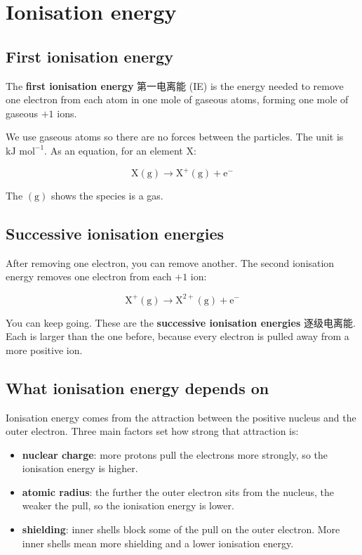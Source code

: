 \documentclass[11pt]{article}
\begin{document}
\section*{Ionisation energy}

\subsection*{First ionisation energy}

The \textbf{first ionisation energy} 第一电离能 (IE) is the energy needed to remove one electron from each atom in one mole of gaseous atoms, forming one mole of gaseous $+1$ ions.

We use gaseous atoms so there are no forces between the particles. The unit is $\text{kJ mol}^{-1}$. As an equation, for an element X:

\[
\text{X}(\text{g}) \rightarrow \text{X}^{+}(\text{g}) + \text{e}^{-}
\]

The $(\text{g})$ shows the species is a gas.

\subsection*{Successive ionisation energies}

After removing one electron, you can remove another. The second ionisation energy removes one electron from each $+1$ ion:

\[
\text{X}^{+}(\text{g}) \rightarrow \text{X}^{2+}(\text{g}) + \text{e}^{-}
\]

You can keep going. These are the \textbf{successive ionisation energies} 逐级电离能. Each is larger than the one before, because every electron is pulled away from a more positive ion.

\subsection*{What ionisation energy depends on}

Ionisation energy comes from the attraction between the positive nucleus and the outer electron. Three main factors set how strong that attraction is:

\begin{itemize}
\item \textbf{nuclear charge}: more protons pull the electrons more strongly, so the ionisation energy is higher.

\item \textbf{atomic radius}: the further the outer electron sits from the nucleus, the weaker the pull, so the ionisation energy is lower.

\item \textbf{shielding}: inner shells block some of the pull on the outer electron. More inner shells mean more shielding and a lower ionisation energy.

\end{itemize}
\end{document}
